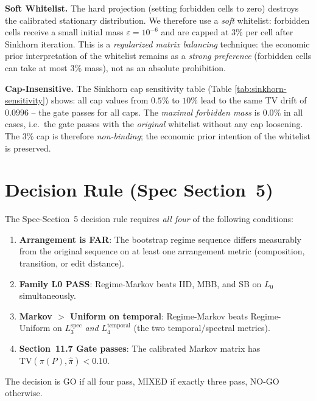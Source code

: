 \documentclass[11pt,a4paper]{article}
\theoremstyle{definition}
\begin{document}
\textbf{Soft Whitelist.} The hard projection (setting forbidden cells to zero) destroys the calibrated stationary distribution. We therefore use a \emph{soft} whitelist: forbidden cells receive a small initial mass $\varepsilon = 10^{-6}$ and are capped at 3\% per cell after Sinkhorn iteration. This is a \emph{regularized matrix balancing} technique: the economic prior interpretation of the whitelist remains as a \emph{strong preference} (forbidden cells can take at most 3\% mass), not as an absolute prohibition.

\textbf{Cap-Insensitive.} The Sinkhorn cap sensitivity table (Table \ref{tab:sinkhorn-sensitivity}) shows: all cap values from $0.5\%$ to $10\%$ lead to the same TV drift of $0.0996$ -- the gate passes for all caps. The \emph{maximal forbidden mass} is $0.0\%$ in all cases, i.e.\ the gate passes with the \emph{original} whitelist without any cap loosening. The 3\% cap is therefore \emph{non-binding}; the economic prior intention of the whitelist is preserved.

\section{Decision Rule (Spec Section~5)}
\label{sec:decision}

The Spec-Section~5 decision rule requires \emph{all four} of the following conditions:

\begin{enumerate}[leftmargin=2em]
  \item \textbf{Arrangement is FAR}: The bootstrap regime sequence differs measurably from the original sequence on at least one arrangement metric (composition, transition, or edit distance).
  \item \textbf{Family L0 PASS}: Regime-Markov beats IID, MBB, and SB on $L_0$ simultaneously.
  \item \textbf{Markov $>$ Uniform on temporal}: Regime-Markov beats Regime-Uniform on $L_3^{\text{spec}}$ \emph{and} $L_4^{\text{temporal}}$ (the two temporal/spectral metrics).
  \item \textbf{Section~11.7 Gate passes}: The calibrated Markov matrix has $\text{TV}(\pi(P), \hat{\pi}) < 0.10$.
\end{enumerate}

The decision is GO if all four pass, MIXED if exactly three pass, NO-GO otherwise.
\end{document}
